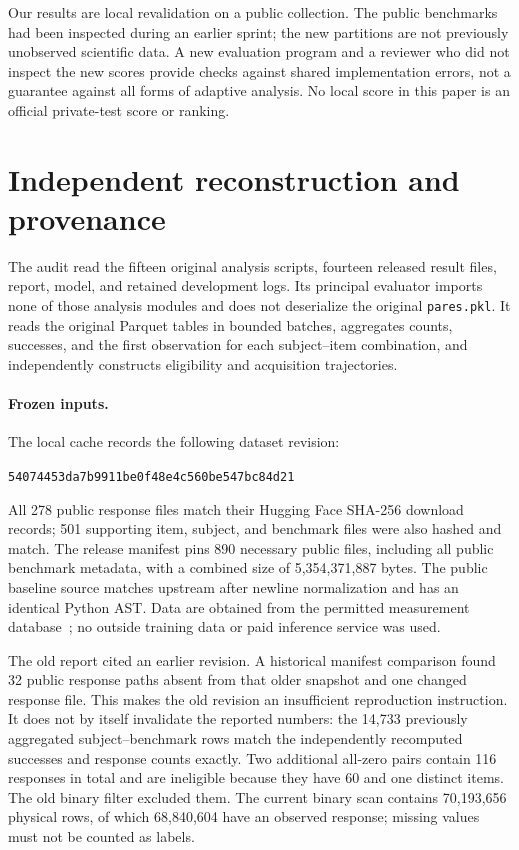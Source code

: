 \documentclass{article}
\begin{document}
Our results are local revalidation on a public collection. The public
benchmarks had been inspected during an earlier sprint; the new partitions
are not previously unobserved scientific data. A new evaluation program and
a reviewer who did not inspect the new scores provide checks against shared
implementation errors, not a guarantee against all forms of adaptive analysis.
No local score in this paper is an official private-test score or ranking.

\section{Independent reconstruction and provenance}
The audit read the fifteen original analysis scripts, fourteen released
result files, report, model, and retained development logs. Its principal
evaluator imports none of those analysis modules and does not deserialize
the original \texttt{pares.pkl}. It reads the original Parquet tables in
bounded batches, aggregates counts, successes, and the first observation
for each subject--item combination, and independently constructs eligibility
and acquisition trajectories.

\paragraph{Frozen inputs.}
The local cache records the following dataset revision:
\begin{center}\small
\texttt{54074453da7b9911be0f48e4c560be547bc84d21}
\end{center}
All 278 public response
files match their Hugging Face SHA-256 download records; 501 supporting item,
subject, and benchmark files were also hashed and match. The release manifest
pins 890 necessary public files, including all public benchmark metadata,
with a combined size of 5,354,371,887 bytes. The public baseline source
matches upstream after newline normalization and has an identical Python AST.
Data are obtained from the permitted measurement database~\cite{data}; no
outside training data or paid inference service was used.

The old report cited an earlier revision. A historical manifest comparison
found 32 public response paths absent from that older snapshot and one changed
response file. This makes the old revision an insufficient reproduction
instruction. It does not by itself invalidate the reported numbers: the
14,733 previously aggregated subject--benchmark rows match the independently
recomputed successes and response counts exactly. Two additional all-zero
pairs contain 116 responses in total and are ineligible because they have
60 and one distinct items. The old binary filter excluded them. The current
binary scan contains 70,193,656 physical rows, of which 68,840,604 have an
observed response; missing values must not be counted as labels.
\end{document}

